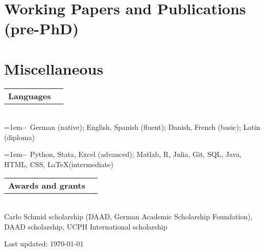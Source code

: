 \documentclass[a4paper,11pt]{article}
\makeatletter
\newcommand{\Subheading}[4]{   
    \vspace{7pt}
    \begin{tabular*}{\textwidth}[t]{@{}l@{\extracolsep{\fill}}r@{}}
        \textbf{#1}\textit{\small #2} & {\footnotesize #3} \\
    \end{tabular*}
    {\small #4}
}
\newcommand{\myitem}[1]{\hangindent=1em\hangafter=1\textbf{--}~#1\par}
\makeatother
\begin{document}
\newpage

\section{Working Papers and Publications (pre-PhD)}
\setlength{\bibitemsep}{1.4ex}
\begin{refsection}
\nocite{*}
\printbibliography[heading=none]
\end{refsection}

\section{Miscellaneous}

\Subheading
    {Languages}{}{}
    {\\
    \myitem{German (native); English, Spanish (fluent); Danish, French (basic); Latin (diploma)}
    \myitem{Python, Stata, Excel (advanced); Matlab, R, Julia, Git, SQL, Java, HTML, CSS, \LaTeX\space(intermediate)}
    }

\Subheading
    {Awards and grants}{}{}
    {\\
    Carlo Schmid scholarship (DAAD, German Academic Scholarship Foundation), DAAD scholarship, UCPH International scholarship
    } 

\vfill
\begin{center}
{\footnotesize Last updated: \today}
\end{center}
\end{document}
